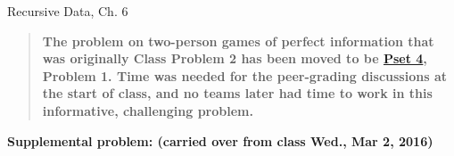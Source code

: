 \documentclass[handout]{mcs}
\begin{document}

\begin{staffnotes}
Recursive Data, Ch. 6
\end{staffnotes}



\begin{quote}
\textbf{ The problem on two-person games of perfect information that
  was originally Class Problem 2 has been moved to be
  \href{https://courses.csail.mit.edu/6.042/spring16/ps4.pdf}{Pset 4},
  Problem 1.  Time was needed for the peer-grading discussions at the
  start of class, and no teams later had time to work in this
  informative, challenging problem.  }
\end{quote}



\begin{center}
\textbf{Supplemental problem: (carried over from class Wed., Mar 2, 2016)}
\end{center}




\end{document}

